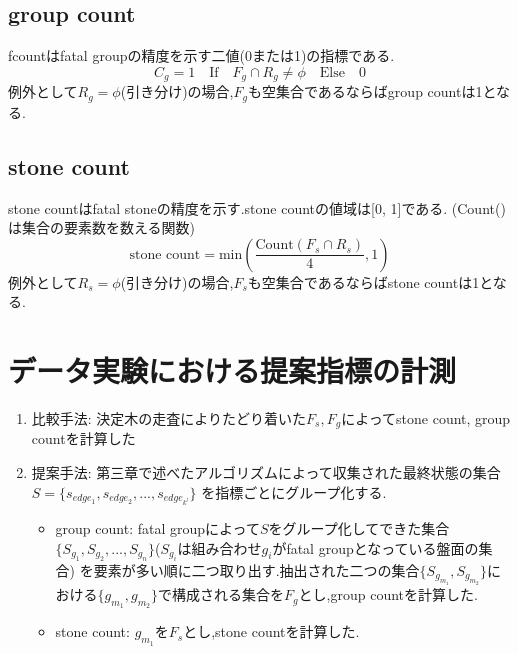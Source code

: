 \subsection{group count}
fcountはfatal groupの精度を示す二値(0または1)の指標である.
\begin{equation}
	{C_g = 1 \quad \textrm{If} \quad F_g \cap R_g \ne \phi \quad \textrm{Else} \quad 0}
\end{equation}
例外として$R_g=\phi$(引き分け)の場合,$F_g$も空集合であるならばgroup countは1となる.
\subsection{stone count}
stone countはfatal stoneの精度を示す.stone countの値域は[0, 1]である.
(Count()は集合の要素数を数える関数)
\begin{equation}
	{\textrm{stone count} = \textrm{min}(\frac{\textrm{Count}(F_s \cap R_s)}{4}, 1)  }
\end{equation}
例外として$R_s=\phi$(引き分け)の場合,$F_s$も空集合であるならばstone countは1となる.
\section{データ実験における提案指標の計測}

\begin{enumerate}
	\item 比較手法: 決定木の走査によりたどり着いた$F_s, F_g$によってstone count, group countを計算した
	\item 提案手法: 第三章で述べたアルゴリズムによって収集された最終状態の集合$S=\{s_{edge_1}, s_{edge_2}, ..., s_{edge_{k^l}}\}$
	    を指標ごとにグループ化する.
		\begin{itemize}
			\item group count: fatal groupによって$S$をグループ化してできた集合$\{S_{g_1}, S_{g_2}, ..., S_{g_n}\}$($S_{g_i}$は組み合わせ$g_i$がfatal groupとなっている盤面の集合)
			を要素が多い順に二つ取り出す.抽出された二つの集合$\{S_{g_{m_1}}, S_{g_{m_2}}\}$における$\{g_{m_1}, g_{m_2}\}$で構成される集合を$F_g$とし,group countを計算した.
			\item stone count: $g_{m_1}$を$F_s$とし,stone countを計算した.
		\end{itemize}
		
\end{enumerate}

